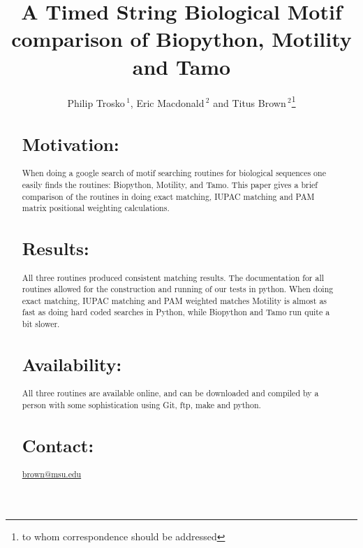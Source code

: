 \documentclass{bioinfo}
\begin{document}

\title[short Title]{A Timed String Biological Motif comparison of Biopython, 
Motility and Tamo}
\author[Sample \textit{et~al}]{Philip Trosko\,$^{1}$, 
Eric Macdonald\,$^{2}$ 
and Titus Brown\,$^2$\footnote{to whom correspondence should be addressed}}
\address{$^{1}$Trosko's Consulting and Programming, 
1630 Sylvan Glen, Okemos, MI, 48864.\\
$^{2}$Department of Molecular Genetics, Michigan State University, 48823.}



\maketitle

\begin{abstract}

\section{Motivation:}
When doing a google search of motif searching routines for biological 
sequences one easily finds the routines: Biopython, Motility, and Tamo.  
This paper gives a brief comparison of the routines in doing exact matching, 
IUPAC matching and PAM matrix positional weighting calculations.

\section{Results:}
All three routines produced consistent matching results.  
The documentation for all routines allowed for the construction and running of
our tests in python.
When doing exact matching, IUPAC matching and PAM weighted matches 
Motility is almost as fast as doing hard coded searches in Python, 
while Biopython and Tamo run quite a bit slower.  

\section{Availability:}
All three routines are available online, 
and can be downloaded and compiled by a person with some sophistication 
using Git, ftp, make and python.
\section{Contact:} \href{brown@msu.edu}{brown@msu.edu}
\end{abstract}
\end{document}
